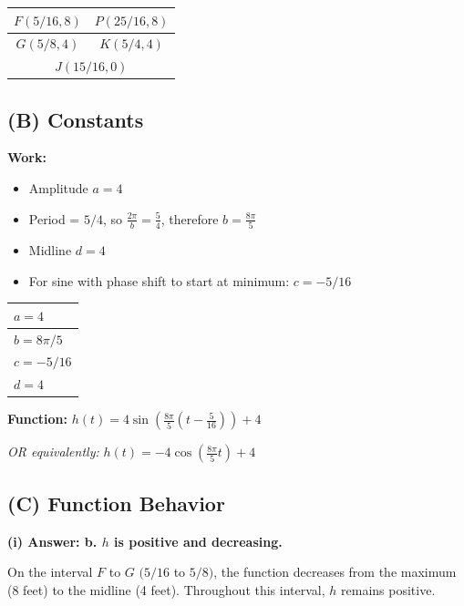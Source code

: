 \documentclass[11pt]{article}
\begin{document}
\begin{center}
\begin{tabular}{|c|c|}
\hline
$F(5/16, 8)$ & $P(25/16, 8)$ \\
\hline
$G(5/8, 4)$ & $K(5/4, 4)$ \\
\hline
\multicolumn{2}{|c|}{$J(15/16, 0)$} \\
\hline
\end{tabular}
\end{center}

\subsection*{(B) Constants}

\textbf{Work:}
\begin{itemize}[noitemsep]
    \item Amplitude $a = 4$
    \item Period = $5/4$, so $\displaystyle\frac{2\pi}{b} = \frac{5}{4}$, therefore $\displaystyle b = \frac{8\pi}{5}$
    \item Midline $d = 4$
    \item For sine with phase shift to start at minimum: $c = -5/16$
\end{itemize}

\begin{center}
\begin{tabular}{|l|}
\hline
$a = 4$ \\[10pt]
\hline
$b = 8\pi/5$ \\[10pt]
\hline
$c = -5/16$ \\[10pt]
\hline
$d = 4$ \\[10pt]
\hline
\end{tabular}
\end{center}

\textbf{Function:} $\displaystyle h(t) = 4 \sin\left(\frac{8\pi}{5}\left(t - \frac{5}{16}\right)\right) + 4$

\textit{OR equivalently:} $\displaystyle h(t) = -4 \cos\left(\frac{8\pi}{5} t\right) + 4$

\subsection*{(C) Function Behavior}

\textbf{(i) Answer: b. $h$ is positive and decreasing.}

On the interval $F$ to $G$ $(5/16$ to $5/8)$, the function decreases from the maximum (8 feet) to the midline (4 feet). Throughout this interval, $h$ remains positive.
\end{document}
